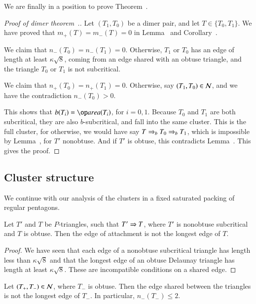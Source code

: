 We are finally in a position to prove Theorem~.

\begin{proof}[Proof of dimer theorem~.]
  Let $(T_1,T_0)$ be a dimer pair, and let $T\in \{T_0,T_1\}$.  We
  have proved that $m_+(T)=m_-(T)=0$ in Lemma~ and
  Corollary~.

  We claim that $n_-(T_0)=n_-(T_1)=0$.  Otherwise, $T_1$ or $T_0$ has
  an edge of length at least $\kappa\sqrt8$, coming from an edge
  shared with an obtuse triangle, and the triangle $T_0$ or $T_1$ is
  not subcritical.

  We claim that $n_+(T_0)=n_+(T_1)=0$.  Otherwise, say
  $(T_1,T_0)\in\mathcal N$, and we have the contradiction $n_-(T_0)>0$.

  This shows that $b(T_i)=\area(T_i)$, for $i=0,1$.  Because $T_0$ and
  $T_1$ are both subcritical, they are also $b$-subcritical, and fall
  into the same cluster.  This is the full cluster, for otherwise, we
  would have say $T\Rightarrow_{b} T_0\Rightarrow_{b} T_1$, which is impossible by
  Lemma~, for $T'$ nonobtuse.  And if $T'$ is
  obtuse, this contradicts Lemma~.
  This gives the proof.
\end{proof}


\subsection{Cluster structure}




We continue with our analysis of the clusters in a fixed saturated
packing of regular pentagons.  

\begin{lemma}  
  Let $T'$ and $T$ be $P$-triangles, such that $T'\Rightarrow T$, where
  $T'$ is nonobtuse subcritical and $T$ is obtuse.  Then the edge
  of attachment is not the longest edge of $T$.
\end{lemma}

\begin{proof} We have seen that each edge of a nonobtuse subcritical
  triangle has length less than $\kappa\sqrt8$ and that the longest
  edge of an obtuse Delaunay triangle has length at least
  $\kappa\sqrt{8}$.  These are incompatible conditions on a shared
  edge.
\end{proof}

\begin{corollary} 
  Let $(T_+,T_-)\in\mathcal N$, where $T_-$ is obtuse.  Then the edge shared
  between the triangles is not the longest edge of $T_-$.  In
  particular, $n_-(T_-)\le 2$.
\end{corollary}

